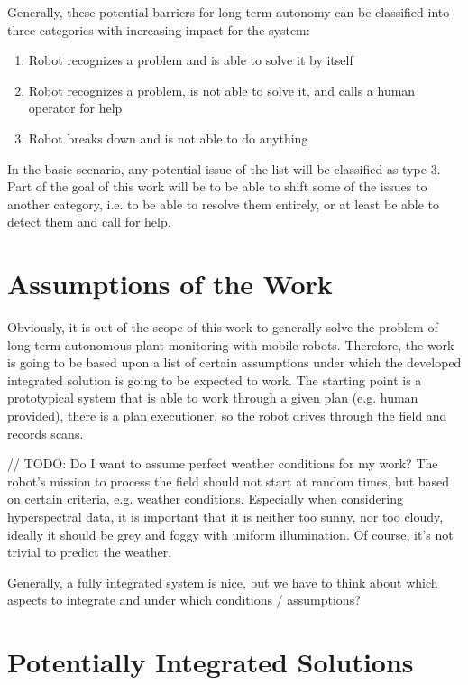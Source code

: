 \documentclass[german, master, expose, latin1]{base/thesis_KBS}
\begin{document}
Generally, these potential barriers for long-term autonomy can be classified into three categories with increasing impact for the system:
\begin{enumerate}
    \item Robot recognizes a problem and is able to solve it by itself
    \item Robot recognizes a problem, is not able to solve it, and calls a human operator for help
    \item Robot breaks down and is not able to do anything
\end{enumerate}

In the basic scenario, any potential issue of the list will be classified as type $3$. Part of the goal of this work will be to be able to shift some of the
issues to another category, i.e. to be able to resolve them entirely, or at least be able to detect them and call for help.

\section{Assumptions of the Work}

Obviously, it is out of the scope of this work to generally solve the problem of long-term autonomous plant monitoring with mobile robots.
Therefore, the work is going to be based upon a list of certain assumptions under which the developed integrated solution is going to be expected to work.
The starting point is a prototypical system that is able to work through a given plan (e.g. human provided), there is a plan executioner,
so the robot drives through the field and records scans.

// TODO: Do I want to assume perfect weather conditions for my work?\newline
The robot's mission to process the field should not start at random times, but based on certain criteria, e.g. weather conditions.
Especially when considering hyperspectral data, it is important that it is neither too sunny, nor too cloudy, ideally it should be grey and
foggy with uniform illumination. Of course, it's not trivial to predict the weather.

Generally, a fully integrated system is nice, but we have to think about which aspects to integrate and under which conditions / assumptions?

\section{Potentially Integrated Solutions}
\end{document}
